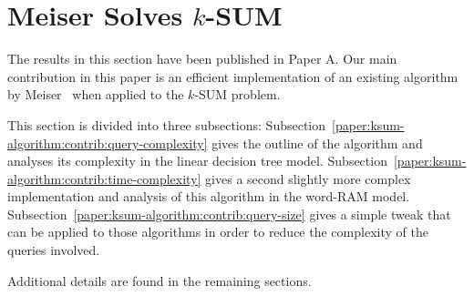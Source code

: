 \section{Meiser Solves \(k\)-SUM}

The results in this section have been published in Paper A.
Our main contribution in this paper is an efficient implementation of an
existing algorithm by Meiser~\cite{M93} when applied to the \(k\)-SUM problem.

This section is divided into three subsections:
Subsection~\ref{paper:ksum-algorithm:contrib:query-complexity} gives the outline of the
algorithm and analyses its complexity in the linear decision tree model.
Subsection~\ref{paper:ksum-algorithm:contrib:time-complexity} gives a second
slightly more complex implementation and analysis of this algorithm in the word-RAM
model. Subsection~\ref{paper:ksum-algorithm:contrib:query-size} gives a simple
tweak that can be applied to those algorithms in order to reduce the complexity
of the queries involved.

Additional details are found in the remaining sections.








